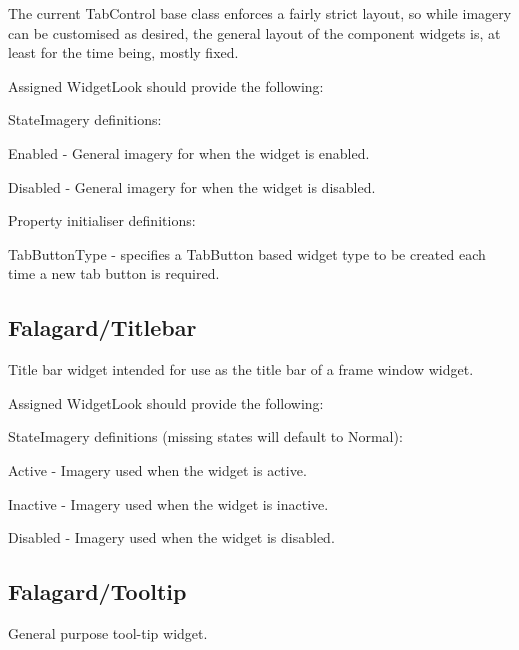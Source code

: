 The current Tab\+Control base class enforces a fairly strict layout, so while imagery can be customised as desired, the general layout of the component widgets is, at least for the time being, mostly fixed.

Assigned Widget\+Look should provide the following\+: 
\begin{DoxyItemize}
\item State\+Imagery definitions\+: 
\begin{DoxyItemize}
\item Enabled -\/ General imagery for when the widget is enabled. 
\item Disabled -\/ General imagery for when the widget is disabled. 
\end{DoxyItemize}


\item Property initialiser definitions\+: 
\begin{DoxyItemize}
\item Tab\+Button\+Type -\/ specifies a Tab\+Button based widget type to be created each time a new tab button is required. 
\end{DoxyItemize}
\end{DoxyItemize}\hypertarget{fal_wr_ref_fal_wr_ref_sec_26}{}\subsection{Falagard/\+Titlebar}\label{fal_wr_ref_fal_wr_ref_sec_26}
Title bar widget intended for use as the title bar of a frame window widget.

Assigned Widget\+Look should provide the following\+: 
\begin{DoxyItemize}
\item State\+Imagery definitions (missing states will default to \textquotesingle{}Normal\textquotesingle{})\+: 
\begin{DoxyItemize}
\item Active -\/ Imagery used when the widget is active. 
\item Inactive -\/ Imagery used when the widget is inactive. 
\item Disabled -\/ Imagery used when the widget is disabled. 
\end{DoxyItemize}
\end{DoxyItemize}\hypertarget{fal_wr_ref_fal_wr_ref_sec_27}{}\subsection{Falagard/\+Tooltip}\label{fal_wr_ref_fal_wr_ref_sec_27}
General purpose tool-\/tip widget.

